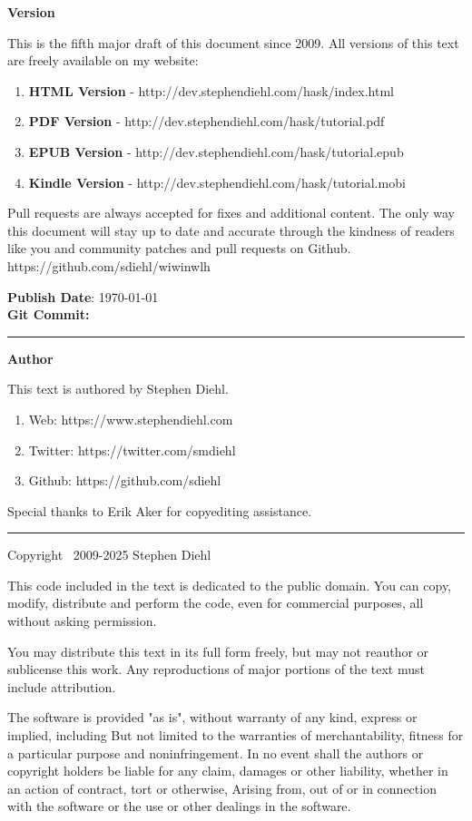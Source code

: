 \Large\textbf{Version}
\normalsize

This is the fifth major draft of this document since 2009. All versions of this
text are freely available on my website:

\begin{enumerate}
\item \textbf{HTML Version}   - http://dev.stephendiehl.com/hask/index.html
\item \textbf{PDF Version}    - http://dev.stephendiehl.com/hask/tutorial.pdf
\item \textbf{EPUB Version}   - http://dev.stephendiehl.com/hask/tutorial.epub
\item \textbf{Kindle Version} - http://dev.stephendiehl.com/hask/tutorial.mobi
\end{enumerate}

Pull requests are always accepted for fixes and additional content.  The only
way this document will stay up to date and accurate through the kindness of
readers like you and community patches and pull requests on Github.
https://github.com/sdiehl/wiwinwlh

\textbf{Publish Date}: \today \\
\textbf{Git Commit:} \texttt{}

\par\noindent\rule{\textwidth}{0.4pt}

\Large\textbf{Author}
\normalsize

This text is authored by Stephen Diehl.

\begin{enumerate}
\item Web: https://www.stephendiehl.com
\item Twitter: https://twitter.com/smdiehl
\item Github: https://github.com/sdiehl
\end{enumerate}

Special thanks to Erik Aker for copyediting assistance.

\par\noindent\rule{\textwidth}{0.4pt}

Copyright \textcopyright \ 2009-2025 Stephen Diehl

This code included in the text is dedicated to the public domain.  You can copy,
modify, distribute and perform the code, even for commercial purposes, all
without asking permission.

You may distribute this text in its full form freely, but may not reauthor or
sublicense this work. Any reproductions of major portions of the text must
include attribution.

The software is provided "as is", without warranty of any kind, express or
implied, including But not limited to the warranties of merchantability, fitness
for a particular purpose and noninfringement. In no event shall the authors or
copyright holders be liable for any claim, damages or other liability, whether
in an action of contract, tort or otherwise, Arising from, out of or in
connection with the software or the use or other dealings in the software.
